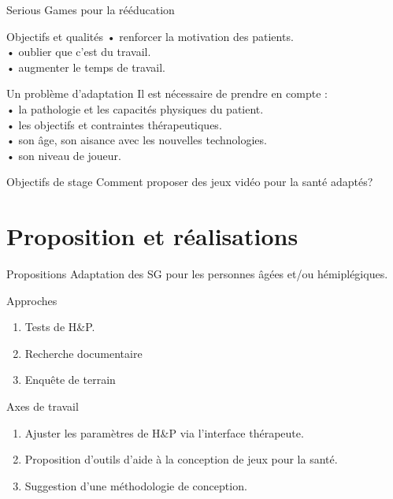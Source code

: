 \documentclass{beamer}
\begin{document}
		\begin{frame}{Serious Games pour la rééducation}
			\begin{exampleblock}{Objectifs et qualités}
				• renforcer la motivation des patients.\\
				• oublier que c'est du travail. \\
				• augmenter le temps de travail.
			\end{exampleblock}
			\begin{alertblock}{Un problème d'adaptation}
			Il est nécessaire de prendre en compte :\\
					• la pathologie et les capacités physiques du patient.\\
					• les objectifs et contraintes thérapeutiques.\\
					• son âge, son aisance avec les nouvelles technologies.\\
					• son niveau de joueur.
			\end{alertblock}
		\end{frame}
	
		\begin{frame}{Objectifs de stage}		
			\large{Comment proposer des jeux vidéo pour la santé adaptés?}
		\end{frame}
		
	\section{Proposition et réalisations}	
		\begin{frame}{Propositions}
		Adaptation des SG pour les personnes âgées et/ou hémiplégiques.
			\begin{block}{Approches}
				\begin{enumerate}
					\item Tests de H\&P.
					\item Recherche documentaire
					\item Enquête de terrain
				\end{enumerate}
			\end{block}
			\begin{exampleblock}{Axes de travail}			
				\begin{enumerate}
					\item Ajuster les paramètres de H\&P via l'interface thérapeute.
					\item Proposition d'outils d'aide à la conception de jeux pour la santé.
					\item Suggestion d'une méthodologie de conception.
				\end{enumerate}
			\end{exampleblock}
		\end{frame}		
				
\end{document}
